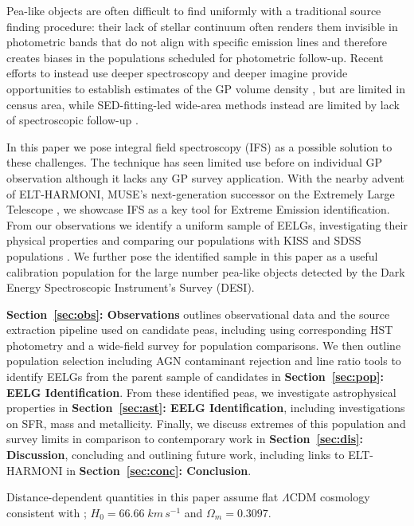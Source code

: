\documentclass[fleqn,usenatbib]{mnras}
\begin{document}
Pea-like objects are often difficult to find uniformly with a traditional source finding procedure: their lack of stellar continuum often renders them invisible in photometric bands that do not align with specific emission lines and therefore creates biases in the populations scheduled for photometric follow-up. Recent efforts to instead use deeper spectroscopy and deeper imagine provide opportunities to establish estimates of the GP volume density \citep{amorin2015, brunker_2020, miller2024}, but are limited in census area, while SED-fitting-led wide-area methods instead are limited by lack of spectroscopic follow-up \cite{yang2017, samonski2025}. 

In this paper we pose integral field spectroscopy (IFS) as a possible solution to these challenges. The technique has seen limited use before on individual GP observation \citep{bosch2019, polonio2023} although it lacks any GP survey application. With the nearby advent of ELT-HARMONI, MUSE’s next-generation successor on the Extremely Large Telescope \citep{harmoni2021}, we showcase IFS as a key tool for Extreme Emission identification. From our observations we identify a uniform sample of EELGs, investigating their physical properties and comparing our populations with KISS and SDSS populations \citep{brunker_2020,samonski2025, jiang}. We further pose the identified sample in this paper as a useful calibration population for the large number pea-like objects detected by the Dark Energy Spectroscopic Instrument’s \citep{desi2016} Survey (DESI).

\textbf{Section~\ref{sec:obs}: Observations} outlines observational data and the source extraction pipeline used on candidate peas, including using corresponding HST photometry and a wide-field survey for population comparisons. We then outline population selection including AGN contaminant rejection and line ratio tools to identify EELGs from the parent sample of candidates in \textbf{Section~\ref{sec:pop}: EELG Identification}. From these identified peas, we investigate astrophysical properties in \textbf{Section~\ref{sec:ast}: EELG Identification}, including investigations on SFR, mass and metallicity. Finally, we discuss extremes of this population and survey limits in comparison to contemporary work in \textbf{Section~\ref{sec:dis}: Discussion}, concluding and outlining future work, including links to ELT-HARMONI in \textbf{Section~\ref{sec:conc}: Conclusion}.

Distance-dependent quantities in this paper assume flat $\Lambda$CDM cosmology consistent with \cite{planck2020}; $H_0=66.66\;km\,s^{-1}$ and $\Omega_m=0.3097$.
\end{document}
